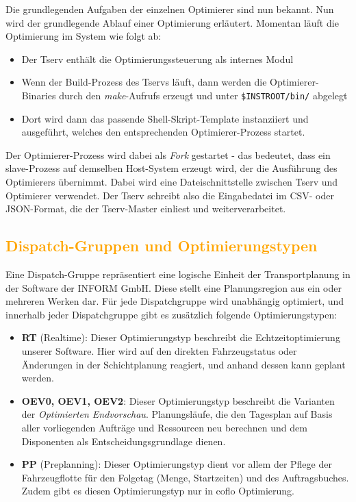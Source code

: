 \documentclass[
    12pt,               
    a4paper,            
    ngerman,            
    parskip=half,       
    headings=normal,   
    numbers=enddot,     
    toc=chapterentrywithdots 
]{scrreprt}\usepackage[utf8]{inputenc}
\begin{document}
Die grundlegenden Aufgaben der einzelnen Optimierer sind nun bekannt. Nun wird der grundlegende Ablauf einer Optimierung erläutert. Momentan läuft die Optimierung im System wie folgt ab:
\begin{itemize}
    \item Der Tserv enthält die Optimierungssteuerung als internes Modul
    \item Wenn der Build-Prozess des Tservs läuft, dann werden die Optimierer-Binaries durch den \textit{make}-Aufrufs erzeugt und unter \texttt{\$INSTROOT/bin/} abgelegt
    \item Dort wird dann das passende Shell-Skript-Template instanziiert und ausgeführt, welches den entsprechenden Optimierer-Prozess startet.
\end{itemize}

Der Optimierer-Prozess wird dabei als \textit{Fork} {\citep[Vgl.][S.53f.]{tanenbaum2015}} gestartet - das bedeutet, dass ein slave-Prozess auf demselben Host-System erzeugt wird, der die Ausführung des Optimierers übernimmt. Dabei wird eine Dateischnittstelle zwischen Tserv und Optimierer verwendet. Der Tserv schreibt also die Eingabedatei im CSV- oder JSON-Format, die der Tserv-Master einliest und weiterverarbeitet.

\subsection{\textcolor{orange}{Dispatch-Gruppen und Optimierungstypen}}

Eine Dispatch-Gruppe repräsentiert eine logische Einheit der Transportplanung in der Software der INFORM GmbH. Diese stellt eine Planungsregion aus ein oder mehreren Werken dar. Für jede Dispatchgruppe wird unabhängig optimiert, und innerhalb jeder Dispatchgruppe gibt es zusätzlich folgende Optimierungstypen:

\begin{itemize}
    \item \textbf{RT} (Realtime): Dieser Optimierungstyp beschreibt die Echtzeitoptimierung unserer Software. Hier wird auf den direkten Fahrzeugstatus oder Änderungen in der Schichtplanung reagiert, und anhand dessen kann geplant werden. 
    \item \textbf{OEV0, OEV1, OEV2}: Dieser Optimierungstyp beschreibt die Varianten der \textit{Optimierten Endvorschau}. Planungsläufe, die den Tagesplan auf Basis aller vorliegenden Aufträge und Ressourcen neu berechnen und dem Disponenten als Entscheidungsgrundlage dienen.
    \item \textbf{PP} (Preplanning):  Dieser Optimierungstyp dient vor allem der Pflege der Fahrzeugflotte für den Folgetag (Menge, Startzeiten) und des Auftragsbuches. Zudem gibt es diesen Optimierungstyp nur in coflo Optimierung.
\end{itemize}
\end{document}
